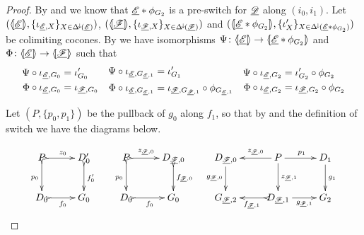 \begin{proof}
	By  and  we know that $\der{E}*\phi_{G_2}$ is a pre-switch for $\der{D}$ along $(i_0, i_1)$. Let $(\tpro{E}, \{\iota_{\der{E}, X}\}_{X\in \Deltamin(\der{E})})$, $(\tpro{F}, \{\iota_{\der{F}, X}\}_{X\in \Deltamin(\der{F})})$ and $(\lpro \der{E}*\phi_{G_2}\rpro , \{\iota'_{X}\}_{X\in \Deltamin(\der{E}*\phi_{G_2})})$ be colimiting cocones. By  we have isomorphisms $\Psi \colon \tpro{E}\to \lpro \der{E}*\phi_{G_2}\rpro $ and $\Phi\colon \tpro{E}\to \tpro{F}$ such that 
	\[\begin{split}
		\Psi\circ \iota_{\der{E}, G_0}&=\iota'_{G_0}\\\Phi\circ \iota_{\der{E}, G_0}&=\iota_{\der{F}, G_0}
	\end{split} \quad \begin{split}
	\Psi \circ \iota_{\der{E}, G_{\der{E}, 1}}&=\iota'_{G_1}\\
	\Phi \circ \iota_{\der{E}, G_{\der{E}, 1}}&=\iota_{\der{F}, G_{\der{F}, 1}}\circ \phi_{G_{\der{E}, 1}}
	\end{split} \quad \begin{split}
	\Psi \circ \iota_{\der{E}, G_2}&=\iota'_{G_2}\circ \phi_{G_2}\\
	\Phi \circ \iota_{\der{E}, G_2}&=\iota_{\der{F}, G_2}\circ \phi_{G_2}
	\end{split}\]
 	
 	Let $(P, \{p_0, p_1\})$ be the pullback of $g_{0}$ along $f_1$, so that by  	and the definition of switch we have the diagrams below. 
 	
 		\[\xymatrix{P\ar@{>->}[r]^{z_0} \ar@{>->}[d]_{p_0}& D'_{0} \ar@{>->}[d]^{f'_{0}} & P \ar@{>->}[d]_{p_0}\ar@{>->}[r]^-{z_{\der{F},0}} & D_{\der{F}, 0}\ar@{>->}[d]^{f_{\der{F},0}} & D_{\der{F},0}  \ar[d]_{g_{\der{F},0}}& P \ar[r]^{p_1} \ar[l]_-{z_{\der{F},0}} \ar[d]^{z_{\der{F},1}} & D_1 \ar[d]^{g_1}\\ D_0\ar@{>->}[r]_{f_0} & G_0 & D_0\ar@{>->}[r]_{f_0} & G_0 & G_{\der{F},2} & D_{\der{F},1} \ar[r]_-{g_{\der{F},1}} \ar@{>->}[l]^-{f_{\der{F},1}} & G_2}\]
 	

\end{proof}
